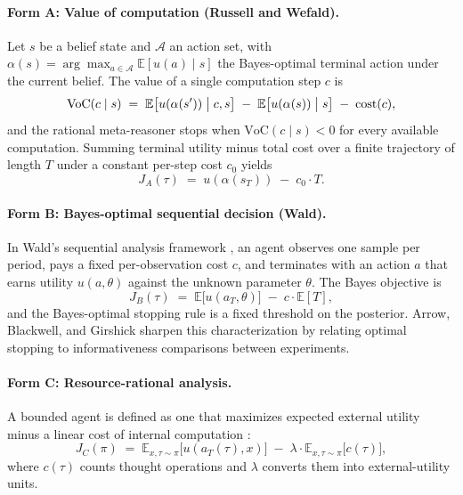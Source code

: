 \paragraph{Form A: Value of computation (Russell and Wefald).}
Let $s$ be a belief state and $\mathcal{A}$ an action set, with $\alpha(s) = \arg\max_{a\in\mathcal{A}} \mathbb{E}[u(a)\mid s]$ the Bayes-optimal terminal action under the current belief. The value of a single computation step $c$ is \citep{russell1991right,hay_selecting_computations}
\begin{equation}
\mathrm{VoC}(c \mid s) \;=\; \mathbb{E}\bigl[u(\alpha(s'))\bigm| c, s\bigr] \;-\; \mathbb{E}\bigl[u(\alpha(s))\bigm| s\bigr] \;-\; \mathrm{cost}(c),
\label{eq:voc}
\end{equation}
and the rational meta-reasoner stops when $\mathrm{VoC}(c\mid s) < 0$ for every available computation. Summing terminal utility minus total cost over a finite trajectory of length $T$ under a constant per-step cost $c_0$ yields
\begin{equation}
J_A(\tau) \;=\; u(\alpha(s_T)) \;-\; c_0 \cdot T.
\label{eq:form-A}
\end{equation}

\paragraph{Form B: Bayes-optimal sequential decision (Wald).}
In Wald's sequential analysis framework \citep{wald1947sequential}, an agent observes one sample per period, pays a fixed per-observation cost $c$, and terminates with an action $a$ that earns utility $u(a,\theta)$ against the unknown parameter $\theta$. The Bayes objective is
\begin{equation}
J_B(\tau) \;=\; \mathbb{E}\bigl[u(a_T,\theta)\bigr] \;-\; c \cdot \mathbb{E}[T],
\label{eq:form-B}
\end{equation}
and the Bayes-optimal stopping rule is a fixed threshold on the posterior. Arrow, Blackwell, and Girshick \citep{blackwell1953equivalent} sharpen this characterization by relating optimal stopping to informativeness comparisons between experiments.

\paragraph{Form C: Resource-rational analysis.}
A bounded agent is defined as one that maximizes expected external utility minus a linear cost of internal computation \citep{callaway_learning_select,lieder_griffiths_2020_resource_rational,rational_metareasoning_llm_paper}:
\begin{equation}
J_C(\pi) \;=\; \mathbb{E}_{x,\tau\sim\pi}\bigl[u(a_T(\tau), x)\bigr] \;-\; \lambda \cdot \mathbb{E}_{x,\tau\sim\pi}\bigl[c(\tau)\bigr],
\label{eq:form-C}
\end{equation}
where $c(\tau)$ counts thought operations and $\lambda$ converts them into external-utility units.


